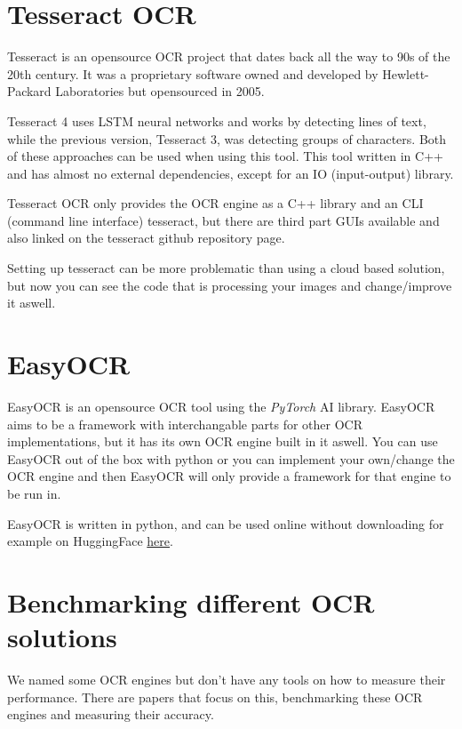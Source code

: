 \documentclass[
  digital,     %
  oneside,     %
  nosansbold,  %
  nocolorbold, %
  nolof,         %
  nolot,         %
]{fithesis4}
\begin{document}
\section{Tesseract OCR\cite{tesseract}}

Tesseract is an opensource OCR project that dates back all the way to 90s of the 20th century. It was a proprietary software owned and developed by Hewlett-Packard Laboratories but opensourced in 2005.

Tesseract 4 uses LSTM neural networks and works by detecting lines of text, while the previous version, Tesseract 3, was detecting groups of characters. Both of these approaches can be used when using this tool. This tool written in C++ and has almost no external dependencies, except for an IO (input-output) library.

Tesseract OCR only provides the OCR engine as a C++ library and an CLI (command line interface) tesseract, but there are third part GUIs available and also linked on the tesseract github repository page.

Setting up tesseract can be more problematic than using a cloud based solution, but now you can see the code that is processing your images and change/improve it aswell.

\section{EasyOCR\cite{easyocr}}

EasyOCR is an opensource OCR tool using the \emph{PyTorch}\cite{pytorch} AI library. EasyOCR aims to be a framework with interchangable parts for other OCR implementations, but it has its own OCR engine built in it aswell. You can use EasyOCR out of the box with python or you can implement your own/change the OCR engine and then EasyOCR will only provide a framework for that engine to be run in.

EasyOCR is written in python, and can be used online without downloading for example on HuggingFace \href{https://huggingface.co/spaces/tomofi/EasyOCR}{here}.

\section{Benchmarking different OCR solutions}

We named some OCR engines but don't have any tools on how to measure their performance. There are papers that focus on this, benchmarking these OCR engines and measuring their accuracy\cite{benchmark}.
\end{document}
